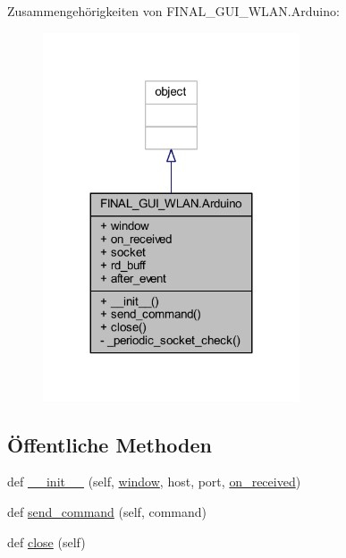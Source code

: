 Zusammengehörigkeiten von F\+I\+N\+A\+L\+\_\+\+G\+U\+I\+\_\+\+W\+L\+A\+N.\+Arduino\+:\nopagebreak
\begin{figure}[H]
\begin{center}
\leavevmode
\includegraphics[width=215pt]{class_f_i_n_a_l___g_u_i___w_l_a_n_1_1_arduino__coll__graph}
\end{center}
\end{figure}
\subsection*{Öffentliche Methoden}
\begin{DoxyCompactItemize}
\item 
def \hyperlink{class_f_i_n_a_l___g_u_i___w_l_a_n_1_1_arduino_ac826ff80647459671ac4367c0c11b7b1}{\+\_\+\+\_\+init\+\_\+\+\_\+} (self, \hyperlink{class_f_i_n_a_l___g_u_i___w_l_a_n_1_1_arduino_a731b3fc58c501b945f1df4d2e8120112}{window}, host, port, \hyperlink{class_f_i_n_a_l___g_u_i___w_l_a_n_1_1_arduino_aecdaccc57653078abe4ffe967cba361e}{on\+\_\+received})
\item 
def \hyperlink{class_f_i_n_a_l___g_u_i___w_l_a_n_1_1_arduino_a2a13c6006cd466ac37ce8e2033d04e96}{send\+\_\+command} (self, command)
\item 
def \hyperlink{class_f_i_n_a_l___g_u_i___w_l_a_n_1_1_arduino_a07b83bfe05b0faf47ad2e6730d3ae795}{close} (self)
\end{DoxyCompactItemize}
